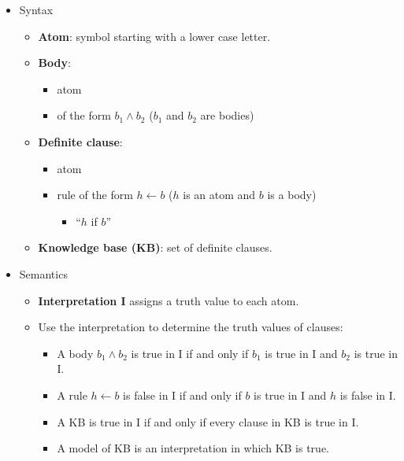 \documentclass{article}
\begin{document}
\begin{itemize}
    \item Syntax
        \begin{itemize}
            \item \textbf{Atom}: symbol starting with a lower case letter.
            \item \textbf{Body}: 
                \begin{itemize}
                    \item atom
                    \item of the form $b_1 \wedge b_2$ ($b_1$ and $b_2$ are bodies)
                \end{itemize}
            \item \textbf{Definite clause}:
                \begin{itemize}
                    \item atom
                    \item rule of the form $h \leftarrow b$ ($h$ is an atom and $b$ is a body)
                        \begin{itemize}
                            \item ``$h$ if $b$''
                        \end{itemize}
                \end{itemize}
            \item \textbf{Knowledge base (KB)}: set of definite clauses.
        \end{itemize}
    \item Semantics
        \begin{itemize}
            \item \textbf{Interpretation I} assigns a truth value to each atom.
            \item Use the interpretation to determine the truth values of clauses:
                \begin{itemize}
                    \item A body $b_1 \wedge b_2$ is true in I if and only if $b_1$ is true in I and $b_2$ is true in I.
                    \item A rule $h \leftarrow b$ is false in I if and only if $b$ is true in I and $h$ is false in I.
                    \item A KB is true in I if and only if every clause in KB is true in I.
                    \item A model of KB is an interpretation in which KB is true.
                \end{itemize}

\end{itemize}
\end{itemize}
\end{document}
